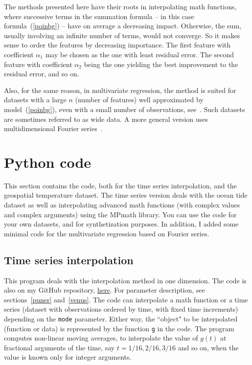 \documentclass[oneside,10pt]{book}
\begin{document}
The methods presented here have their roots in interpolating math functions, where successive terms in the summation formula -- in this case formula~(\ref{poinbg}) -- have on average a decreasing impact. Otherwise, the sum, usually involving an infinite number of terms, would not converge. So it makes sense to order the features by decreasing importance. The first feature with coefficient $\alpha_1$ may be chosen as the one with least residual error. The second feature with coefficient $\alpha_2$ being the one yielding the best improvement to the residual error, and so on.

Also, for the same reason, in multivariate regression, the method is suited for datasets with a large $n$ (number of features)  well approximated by model~(\ref{poinbg}), even with a small number of observations, see~\cite{four2}.
 Such datasets are sometimes referred to as \textcolor{index}{wide data}. A more general version uses \textcolor{index}{multidimensional Fourier series}~\cite{mfour10}.



\section{Python code}

This section contains the code, both for the time series interpolation, and the geospatial temperature dataset. The time series version
  deals with the ocean tide dataset as well as interpolating advanced math functions (with complex values and complex arguments) using the MPmath library. You can use the code for your own datasets, and for synthetization purposes. In addition, I added some minimal code for the multivariate regression based on Fourier series.

\subsection{Time series interpolation}\label{porewa}

This program deals with the interpolation method in one dimension. The code is also on my
GitHub repository, \href{https://github.com/VincentGranville/Statistical-Optimization/blob/main/interpol_fourier.py}{here}. For parameter description, see
 sections~\ref{puner} and~\ref{venus}.  The code can interpolate a math function or a time series (dataset with observations ordered by time, with fixed time increments) depending on
 the \texttt{mode} parameter. Either way, the ``object" to be interpolated (function or data) is represented by the function \texttt{g} in the code. The program computes
 non-linear moving averages,  to interpolate the value of $g(t)$ at fractional arguments of the time, say $t = 1/16, 2/16, 3/16$ and so on, when the value is known  only for integer arguments.
\end{document}
